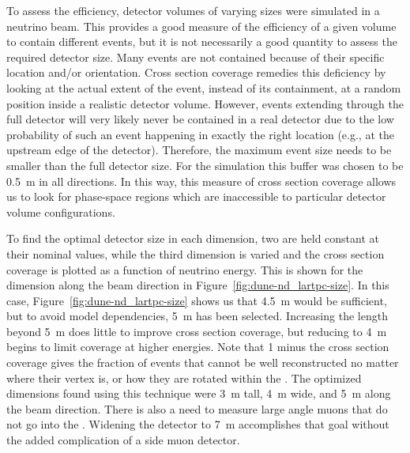 To assess the efficiency, detector volumes of varying sizes were simulated in a neutrino beam.
This provides a good measure of the efficiency of a given volume to contain different events, but it is not necessarily a good quantity to assess the required detector size.
Many events are not contained because of their specific location and/or orientation.
Cross section coverage remedies this deficiency by looking at the actual extent of the event, instead of its containment, at a random position inside a realistic detector volume.
However, events extending through the full detector will very likely never be contained in a real detector due to the low probability of such an event happening in exactly the right location (e.g., at the upstream edge of the detector).
Therefore, the maximum event size needs to be smaller than the full detector size.
For the  simulation this buffer was chosen to be \SI{0.5}{\metre} in all directions.
In this way, this measure of cross section coverage allows us to look for phase-space regions which are inaccessible to particular detector volume configurations.

To find the optimal detector size in each dimension, two are held constant at their nominal values, while the third dimension is varied and the cross section coverage is plotted as a function of neutrino energy. 
This is shown for the dimension along the beam direction in Figure~\ref{fig:dune-nd_lartpc-size}. In this case, Figure~\ref{fig:dune-nd_lartpc-size} shows us that
\SI{4.5}{\metre} would be sufficient, but to avoid model dependencies, \SI{5}{\metre} has been selected.
Increasing the length beyond \SI{5}{\metre} does little to improve cross section coverage, but reducing to \SI{4}{\metre} begins to limit coverage at higher energies.
Note that 1 minus the cross section coverage gives the fraction of events that cannot be well reconstructed no matter where their vertex is, or how they are rotated within the . The optimized dimensions found using this technique were \SI{3}{\metre} tall, \SI{4}{\metre} wide, and \SI{5}{\metre} along the beam direction. There is also a need to measure large angle muons that do not go into the . Widening the detector to \SI{7}{\metre} accomplishes that goal without the added complication of a side muon detector. 



